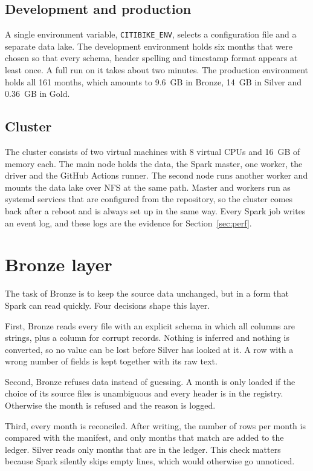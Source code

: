 \documentclass[11pt,a4paper]{article}
\newcommand{\code}[1]{\texttt{\small #1}}
\begin{document}
\subsection{Development and production}

A single environment variable, \code{CITIBIKE\_ENV}, selects a configuration file and a separate data lake. The development
environment holds six months that were chosen so that every schema, header spelling and timestamp format appears at least
once. A full run on it takes about two minutes. The production environment holds all 161 months, which amounts to 9.6~GB
in Bronze, 14~GB in Silver and 0.36~GB in Gold.

\subsection{Cluster}

The cluster consists of two virtual machines with 8 virtual CPUs and 16~GB of memory each. The main node holds the data,
the Spark master, one worker, the driver and the GitHub Actions runner. The second node runs another worker and mounts the
data lake over NFS at the same path. Master and workers run as systemd services that are configured from the repository,
so the cluster comes back after a reboot and is always set up in the same way. Every Spark job writes an event log, and
these logs are the evidence for Section~\ref{sec:perf}.

\section{Bronze layer}

The task of Bronze is to keep the source data unchanged, but in a form that Spark can read quickly. Four decisions shape
this layer.

First, Bronze reads every file with an explicit schema in which all columns are strings, plus a column for corrupt
records. Nothing is inferred and nothing is converted, so no value can be lost before Silver has looked at it. A row with a
wrong number of fields is kept together with its raw text.

Second, Bronze refuses data instead of guessing. A month is only loaded if the choice of its source files is unambiguous
and every header is in the registry. Otherwise the month is refused and the reason is logged.

Third, every month is reconciled. After writing, the number of rows per month is compared with the manifest, and only
months that match are added to the ledger. Silver reads only months that are in the ledger. This check matters because
Spark silently skips empty lines, which would otherwise go unnoticed.
\end{document}
